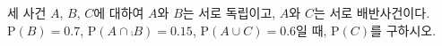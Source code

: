 세 사건 $A$, $B$, $C$에 대하여 $A$와 $B$는 서로 독립이고, $A$와 $C$는 서로 배반사건이다. $\mathrm{P}(B)=0.7$, $\mathrm{P}(A\cap\comp{B})=0.15$, $\mathrm{P}(A\cup C)=0.6$일 때, $\mathrm{P}(C)$를 구하시오.
